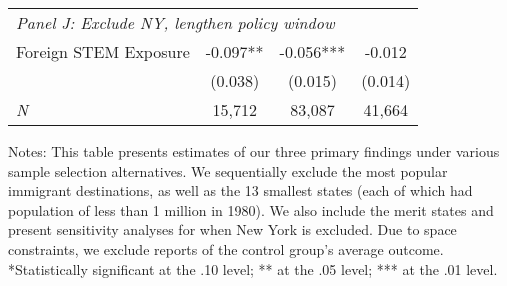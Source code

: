 \begin{table}[ht]
{\begin{threeparttable}
\begin{tabular}{lccc}
\multicolumn{4}{l}{\emph{Panel J: Exclude NY, lengthen policy window}}\\ 
Foreign STEM Exposure & -0.097** & -0.056*** & -0.012  \\ 
 &  (0.038)        & (0.015)        & (0.014) \\ 
\emph{N} &     15,712          &    83,087          &    41,664 \\ 
\bottomrule 
\end{tabular} 
\footnotesize Notes: This table presents estimates of our three primary findings under various sample selection alternatives. We sequentially exclude the most popular immigrant destinations, as well as the 13 smallest states (each of which had population of less than 1 million in 1980). We also include the merit states and present sensitivity analyses for when New York is excluded. Due to space constraints, we exclude reports of the control group's average outcome. *Statistically significant at the .10 level; ** at the .05 level; *** at the .01 level.
\end{threeparttable} 
} 
\end{table} 
